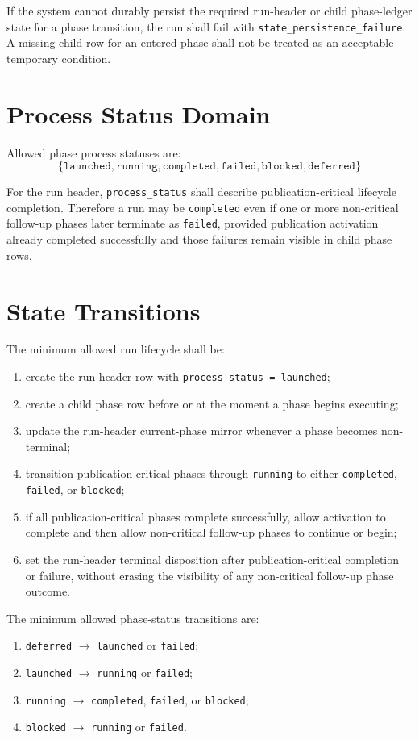 \documentclass[11pt]{report}
\begin{document}
If the system cannot durably persist the required run-header or child phase-ledger state for a phase transition, the run shall fail with \texttt{state\_persistence\_failure}. A missing child row for an entered phase shall not be treated as an acceptable temporary condition.

\section{Process Status Domain}
Allowed phase process statuses are:
\[
\{\texttt{launched}, \texttt{running}, \texttt{completed}, \texttt{failed}, \texttt{blocked}, \texttt{deferred}\}
\]

For the run header, \texttt{process\_status} shall describe publication-critical lifecycle completion. Therefore a run may be \texttt{completed} even if one or more non-critical follow-up phases later terminate as \texttt{failed}, provided publication activation already completed successfully and those failures remain visible in child phase rows.

\section{State Transitions}
The minimum allowed run lifecycle shall be:
\begin{enumerate}[leftmargin=1.2cm]
    \item create the run-header row with \texttt{process\_status = launched};
    \item create a child phase row before or at the moment a phase begins executing;
    \item update the run-header current-phase mirror whenever a phase becomes non-terminal;
    \item transition publication-critical phases through \texttt{running} to either \texttt{completed}, \texttt{failed}, or \texttt{blocked};
    \item if all publication-critical phases complete successfully, allow activation to complete and then allow non-critical follow-up phases to continue or begin;
    \item set the run-header terminal disposition after publication-critical completion or failure, without erasing the visibility of any non-critical follow-up phase outcome.
\end{enumerate}

The minimum allowed phase-status transitions are:
\begin{enumerate}[leftmargin=1.2cm]
    \item \texttt{deferred} \(\rightarrow\) \texttt{launched} or \texttt{failed};
    \item \texttt{launched} \(\rightarrow\) \texttt{running} or \texttt{failed};
    \item \texttt{running} \(\rightarrow\) \texttt{completed}, \texttt{failed}, or \texttt{blocked};
    \item \texttt{blocked} \(\rightarrow\) \texttt{running} or \texttt{failed}.
\end{enumerate}
\end{document}
